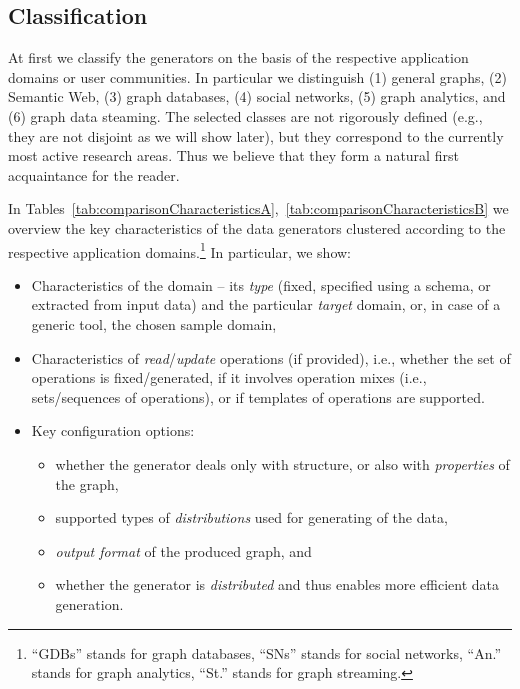 %

\subsection{Classification}


At first we classify the generators on the basis of the respective application domains or user communities. In particular we distinguish (1) general graphs, (2) Semantic Web, (3) graph databases, (4) social networks, (5) graph analytics, and (6) graph data steaming. The selected classes are not rigorously defined (e.g., they are not disjoint as we will show later), but they correspond to the currently most active research areas. Thus we believe that they form a natural first acquaintance for the reader.

In Tables~\ref{tab:comparisonCharacteristicsA},~\ref{tab:comparisonCharacteristicsB}   we overview the key characteristics of the data generators clustered according to the respective application domains.\footnote{``GDBs'' stands for graph databases, ``SNs'' stands for social networks, ``An.'' stands for graph analytics, ``St.'' stands for graph streaming.} In particular, we show:

\begin{itemize}
\item Characteristics of the domain -- its \textit{type} (fixed, specified using a schema, or extracted from input data) and the particular \textit{target} domain, or, in case of a generic tool, the chosen sample domain,
\item Characteristics of \textit{read}/\textit{update} operations (if provided), i.e., whether the set of operations is fixed/generated, if it involves operation mixes (i.e., sets/sequences of operations), or if templates of operations are supported.
\item Key configuration options:
  \begin{itemize}
    \item whether the generator deals only with structure, or also with \textit{properties} of the graph,
    \item supported types of \textit{distributions} used for generating of the data,
    \item \textit{output format} of the produced graph, and
    \item  whether the generator is \textit{distributed} and thus enables more efficient data generation.
  \end{itemize}
\end{itemize}


